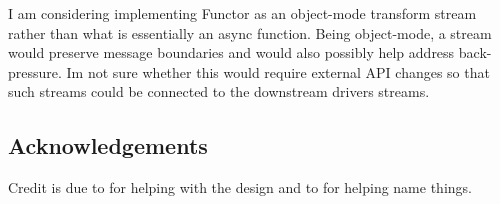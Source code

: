 I am considering implementing {\ttfamily Functor} as an object-\/mode transform stream rather than what is essentially an async function. Being object-\/mode, a stream would preserve message boundaries and would also possibly help address back-\/pressure. I\textquotesingle{}m not sure whether this would require external A\+PI changes so that such streams could be connected to the downstream driver\textquotesingle{}s streams.

\subsection*{Acknowledgements}

Credit is due to \href{https://github.com/mnowster}{\tt } for helping with the design and to \href{https://github.com/fronx}{\tt } for helping name things. 